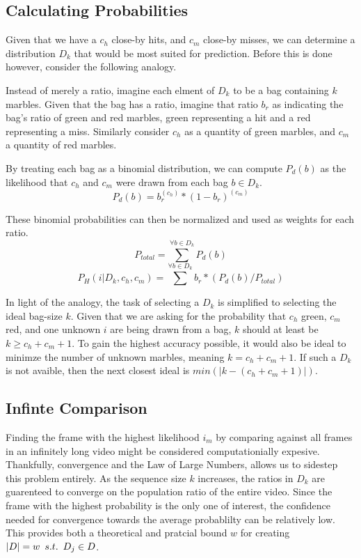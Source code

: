 \documentclass{article}
\def\suchThat{\hspace{0.5em} s.t. \hspace{0.5em}}
\newcommand{\br}{ \hfill \break}
\begin{document}
\begin{adjustwidth}{2.5em}{0pt}
    \subsection{Calculating Probabilities}
        Given that we have a $c_h$ close-by hits, and $c_m$ close-by misses, we can determine a distribution $D_k$ that would be most suited for prediction. Before this is done however, consider the following analogy.\br\br
        
        Instead of merely a ratio, imagine each elment of $D_k$ to be a bag containing $k$ marbles. Given that the bag has a ratio, imagine that ratio $b_r$ as indicating the bag's ratio of green and red marbles, green representing a hit and a red representing a miss. Similarly consider $c_h$ as a quantity of green marbles, and $c_m$ a quantity of red marbles.\br\br
        
        By treating each bag as a binomial distribution, we can compute $P_d(b)$ as the likelihood that $c_h$ and $c_m$ were drawn from each bag $b \in D_k$.
                    $$ P_d(b) =  b_r^{(c_h)} * (1-b_r)^{(c_m)} $$
        
        These binomial probabilities can then be normalized and used as weights for each ratio. 
                    $$ P_\mathit{total} = \displaystyle\sum^{\forall b \in D_k} P_d(b) $$
                    $$ P_H(i | D_k, c_h, c_m) = \displaystyle\sum^{\forall b \in D_k} b_r * ( P_d(b) / P_\mathit{total} )  $$
        
        In light of the analogy, the task of selecting a $D_k$ is simplified to selecting the ideal bag-size $k$. Given that we are asking for the probability that $c_h$ green, $c_m$ red, and one unknown $i$ are being drawn from a bag, $k$ should at least be $k \geq c_h + c_m + 1$. To gain the highest accuracy possible, it would also be ideal to minimze the number of unknown marbles, meaning $k = c_h + c_m + 1$. If such a $D_k$ is not avaible, then the next closest ideal is $min(|k - (c_h + c_m + 1)|)$.
    
    \subsection{Infinte Comparison}
        Finding the frame with the highest likelihood $i_m$ by comparing against all frames in an infinitely long video might be considered computationially expesive. Thankfully, convergence and the Law of Large Numbers, allows us to sidestep this problem entirely. As the sequence size $k$ increases, the ratios in $D_k$ are guarenteed to converge on the population ratio of the entire video. Since the frame with the highest probability is the only one of interest, the confidence needed for convergence towards the average probablilty can be relatively low. This provides both a theoretical and pratcial bound $w$ for creating $|D| = w \suchThat D_j \in D$.
        

\end{adjustwidth}
\end{document}
